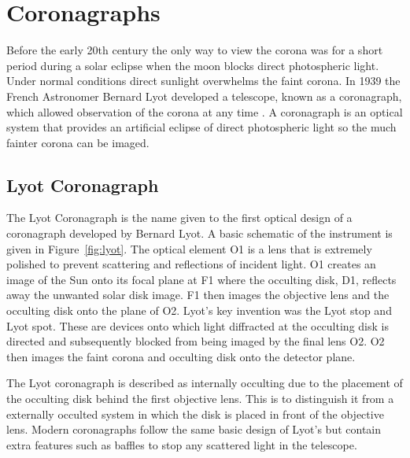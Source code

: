\section{Coronagraphs}
Before the early 20th century the only way to view the corona was for a short period during a solar eclipse when the moon blocks direct photospheric light. Under normal conditions direct sunlight overwhelms the faint corona. In 1939 the French Astronomer Bernard Lyot developed a telescope, known as a coronagraph, which allowed observation of the corona at any time \citep{lyot1939}. A coronagraph is an optical system that provides an artificial eclipse of direct photospheric light so the much fainter corona can be imaged.

\subsection{Lyot Coronagraph}\label{sec:22}
The Lyot Coronagraph is the name given to the first optical design of a coronagraph developed by Bernard Lyot. A basic schematic of the instrument is given in Figure~\ref{fig:lyot}. The optical element O1 is a lens that is extremely polished to prevent scattering and reflections of incident light. O1 creates an image of the Sun onto its focal plane at F1 where the occulting disk, D1, reflects away the unwanted solar disk image. F1 then images the objective lens and the occulting disk onto the plane of O2. Lyot's key invention was the Lyot stop and Lyot spot. These are devices onto which light diffracted at the occulting disk is directed and subsequently blocked from being imaged by the final lens O2. O2 then images the faint corona and occulting disk onto the detector plane. 

The Lyot coronagraph is described as internally occulting due to the placement of the occulting disk behind the first objective lens. This is to distinguish it from a externally occulted system in which the disk is placed in front of the objective lens. Modern coronagraphs follow the same basic design of Lyot's but contain extra features such as baffles to stop any scattered light in the telescope. 


